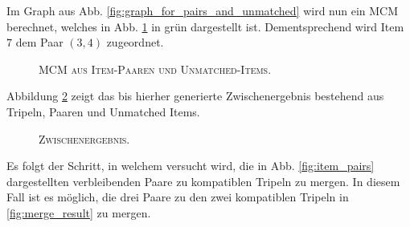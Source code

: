 Im Graph aus Abb. \ref{fig:graph_for_pairs_and_unmatched} wird nun ein \textsc{MCM} berechnet, welches
in Abb. \ref{fig:mcm_for_pairs_and_unmatched} in grün dargestellt ist.
Dementsprechend wird Item $7$ dem Paar $(3, 4)$ zugeordnet.

\begin{figure}[H]
\centering
{}
\caption{\textsc{MCM aus Item-Paaren und Unmatched-Items.}}
\label{fig:mcm_for_pairs_and_unmatched}
\end{figure}

\pagebreak

Abbildung \ref{fig:intermediate_result} zeigt das bis hierher generierte Zwischenergebnis bestehend aus Tripeln, Paaren
und Unmatched Items.

\begin{figure}[H]
\centering
{}
\caption{\textsc{Zwischenergebnis.}}
\label{fig:intermediate_result}
\end{figure}

Es folgt der Schritt, in welchem versucht wird, die in Abb. \ref{fig:item_pairs} dargestellten verbleibenden Paare zu
kompatiblen Tripeln zu mergen. In diesem Fall ist es möglich, die drei Paare zu den zwei kompatiblen Tripeln in
\ref{fig:merge_result} zu mergen.

